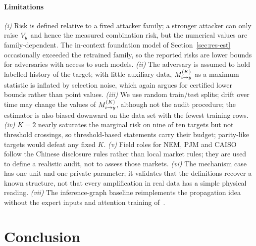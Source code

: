 \paragraph{Limitations}
\emph{(i)} Risk is defined relative to a fixed attacker family; a stronger attacker can only raise
$V_{y}$ and hence the measured combination risk, but the numerical values are family-dependent. The in-context foundation
model of Section~\ref{sec:res-est} occasionally exceeded the retrained family, so the reported risks are lower bounds for
adversaries with access to such models.
\emph{(ii)} The adversary is assumed to hold labelled history of the target; with little auxiliary
data, $M^{(K)}_{i \to y}$ as a maximum statistic is inflated by selection noise, which again argues for certified
lower bounds rather than point values. \emph{(iii)} We use random train/test splits; drift over time
may change the values of $M^{(K)}_{i \to y}$, although not the audit procedure; the estimator is also biased downward on the data set
with the fewest training rows. \emph{(iv)} $K=2$ nearly saturates the marginal risk on nine of ten targets but not threshold
crossings, so threshold-based statements carry their budget; parity-like targets would defeat any fixed $K$. \emph{(v)} Field roles for NEM, PJM and CAISO follow the Chinese disclosure rules rather
than local market rules; they are used to define a realistic audit, not to assess those markets.
\emph{(vi)} The mechanism case has one unit and one private parameter; it validates that the
definitions recover a known structure, not that every amplification in real data has a simple physical
reading. \emph{(vii)} The inference-graph baseline reimplements the propagation idea without the expert inputs
and attention training of~\cite{hu2026ignn}.

\section{Conclusion}\label{sec:conclusion}

